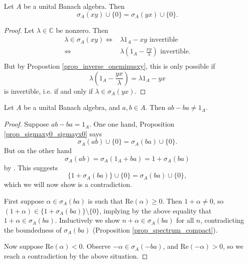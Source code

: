 \documentclass[12pt]{article}
\begin{document}
\begin{proposition}
\label{prop_sigmaxy0_sigmayx0}
	Let $A$ be a unital Banach algebra. Then 
	\begin{equation*}
		\sigma_A(xy) \cup \{0\} = \sigma_A(yx) \cup \{0\}.
	\end{equation*}
\end{proposition}
\begin{proof}
	Let $\lambda\in\mathbb{C}$ be nonzero. Then 
	\begin{align*}
		\lambda\in\sigma_A(xy)
		\Longleftrightarrow& \lambda 1_A - xy \text{ invertible} \\
		\Longleftrightarrow& \lambda\left(1_A - \frac{xy}{\lambda}\right) \text{ invertible}. \\
	\end{align*}
	But by Propostion \ref{prop_inverse_oneminusxy}, this is only possible if 
	\begin{equation*}
		\lambda\left(1_A - \frac{yx}{\lambda} \right) = \lambda 1_A - yx
	\end{equation*}
	is invertible, i.e. if and only if $\lambda\in\sigma_A(yx)$.
\end{proof}

\begin{proposition}
	Let $A$ be a unital Banach algebra, and $a,b\in A$. Then $ab-ba\neq 1_A$.
\end{proposition}
\begin{proof}
	Suppose $ab-ba = 1_A$. One one hand, Proposition \ref{prop_sigmaxy0_sigmayx0} says
	\begin{equation*}
		\sigma_A(ab) \cup \{0\} = \sigma_A(ba) \cup \{0\}.
	\end{equation*}
	But on the other hand 
	\begin{equation*}
		\sigma_A(ab) = \sigma_A(1_A + ba) = 1 + \sigma_A(ba)
	\end{equation*}
	by . This suggests
	\begin{equation*}
		\{1 + \sigma_A(ba) \} \cup \{0\} = \sigma_A(ba) \cup \{0\},
	\end{equation*}
	which we will now show is a contradiction.

	First suppose $\alpha\in\sigma_A(ba)$ is such that $\text{Re}(\alpha)\geq 0$. Then $1+\alpha\neq 0$, so $(1+\alpha)\in \{1 + \sigma_A(ba)\} \setminus \{0\}$, implying by the above equality that $1+\alpha\in\sigma_A(ba)$. Inductively we show $n+\alpha\in\sigma_A(ba)$ for all $n$, contradicting the boundedness of $\sigma_A(ba)$ (Proposition \ref{prop_spectrum_compact}). 

	Now suppose $\text{Re}(\alpha) < 0$. Observe $-\alpha\in\sigma_A(-ba)$, and $\text{Re}(-\alpha)>0$, so we reach a contradiction by the above situation. 
\end{proof}
\end{document}
